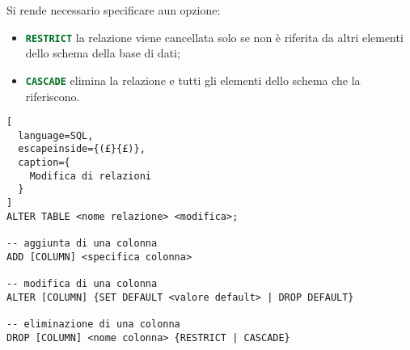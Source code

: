 Si rende necessario specificare aun opzione:
\begin{itemize}
  \item \lstinline[language=SQL]{RESTRICT} la relazione viene cancellata solo se
    non è riferita da altri elementi dello schema della base di dati;
  \item \lstinline[language=SQL]{CASCADE} elimina la relazione e tutti gli
    elementi dello schema che la riferiscono.
\end{itemize}

\begin{lstlisting}[
  language=SQL,
  escapeinside={(£}{£)},
  caption={
    Modifica di relazioni
  }
]
ALTER TABLE <nome relazione> <modifica>;

-- aggiunta di una colonna
ADD [COLUMN] <specifica colonna>

-- modifica di una colonna
ALTER [COLUMN] {SET DEFAULT <valore default> | DROP DEFAULT}

-- eliminazione di una colonna
DROP [COLUMN] <nome colonna> {RESTRICT | CASCADE}
\end{lstlisting}

